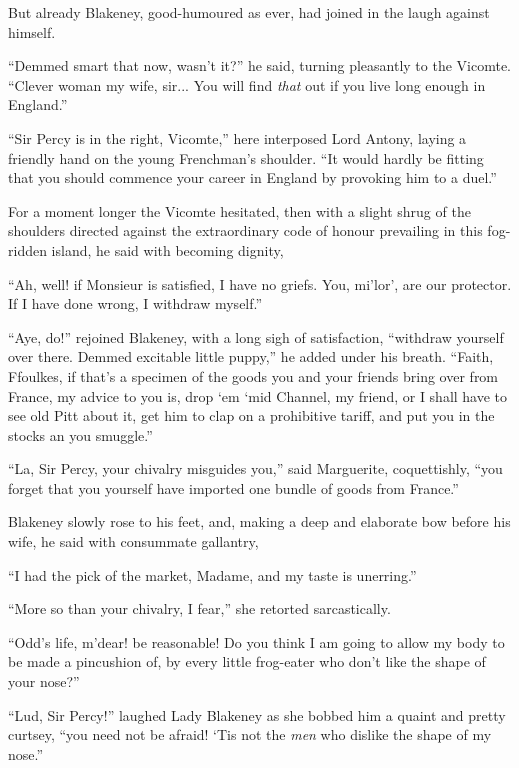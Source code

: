 But already Blakeney, good-humoured as ever, had joined in the laugh against himself.

\enquote{Demmed smart that now, wasn't it?} he said, turning pleasantly to the Vicomte. \enquote{Clever woman my wife, sir... You will find \textit{that} out if you live long enough in England.}

\enquote{Sir Percy is in the right, Vicomte,} here interposed Lord Antony, laying a friendly hand on the young Frenchman's shoulder. \enquote{It would hardly be fitting that you should commence your career in England by provoking him to a duel.}

For a moment longer the Vicomte hesitated, then with a slight shrug of the shoulders directed against the extraordinary code of honour prevailing in this fog-ridden island, he said with becoming dignity,\longdash


\enquote{Ah, well! if Monsieur is satisfied, I have no griefs. You, mi'lor’, are our protector. If I have done wrong, I withdraw myself.}

\enquote{Aye, do!} rejoined Blakeney, with a long sigh of satisfaction, \enquote{withdraw yourself over there. Demmed excitable little puppy,} he added under his breath. \enquote{Faith, Ffoulkes, if that's a specimen of the goods you and your friends bring over from France, my advice to you is, drop `em `mid Channel, my friend, or I shall have to see old Pitt about it, get him to clap on a prohibitive tariff, and put you in the stocks an you smuggle.}

\enquote{La, Sir Percy, your chivalry misguides you,} said Marguerite, coquettishly, \enquote{you forget that you yourself have imported one bundle of goods from France.}

Blakeney slowly rose to his feet, and, making a deep and elaborate bow before his wife, he said with consummate gallantry,\longdash


\enquote{I had the pick of the market, Madame, and my taste is unerring.}

\enquote{More so than your chivalry, I fear,} she retorted sarcastically.

\enquote{Odd's life, m'dear! be reasonable! Do you think I am going to allow my body to be made a pincushion of, by every little frog-eater who don't like the shape of your nose?}

\enquote{Lud, Sir Percy!} laughed Lady Blakeney as she bobbed him a quaint and pretty curtsey, \enquote{you need not be afraid! `Tis not the \textit{men} who dislike the shape of my nose.}

